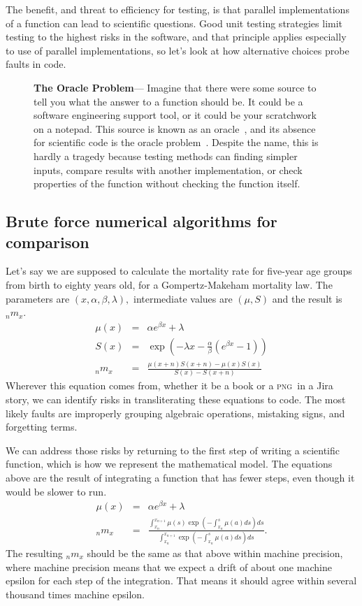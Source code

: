 \documentclass[fleqn,10pt]{olplainarticle}
\newenvironment{callout}
{
\begin{figure}
\begin{center}
\begin{minipage}{0.9\textwidth}
\begin{framed}
}
{
\end{framed}
\end{minipage}
\end{center}
\end{figure}
}
\begin{document}
The benefit, and threat to efficiency for testing, is that
parallel implementations of a function can lead to scientific
questions. Good unit testing strategies limit testing to the
highest risks in the software, and that principle applies
especially to use of parallel implementations, so let's
look at how alternative choices probe faults in code.

\begin{callout}
\textbf{The Oracle Problem}---
Imagine that there were some source to tell you what the answer to a function
should be. It could be a software engineering support tool, or it could
be your scratchwork on a notepad. This source is known as an
oracle~\citep{howden1986functional}, and its absence for scientific code
is the oracle problem~\citep{sirer1999using}. Despite the name, this
is hardly a tragedy because testing methods can 
finding simpler inputs, compare results with another implementation,
or check properties of the function without checking the function itself.
\end{callout}


\subsection{Brute force numerical algorithms for comparison}

Let's say we are supposed to calculate the mortality rate
for five-year age groups from birth to eighty years old,
for a Gompertz-Makeham mortality law. The parameters are
$(x, \alpha, \beta, \lambda),$ intermediate values are $(\mu, S)$ and the result is ${}_nm_x$.
\begin{eqnarray}
  \mu(x) & =&  \alpha e^{\beta x} + \lambda \\
  S(x) & = & \exp\left(-\lambda x - \frac{\alpha}{\beta}\left(e^{\beta x} - 1\right)\right) \\
  {}_nm_x & = & \frac{\mu(x+n) S(x+n) - \mu(x)S(x)}{S(x) - S(x+n)}
\end{eqnarray}
Wherever this equation comes from, whether it be a book or a
\textsc{png}\ in a Jira story, we can identify risks in transliterating
these equations to code. The most likely faults are improperly grouping
algebraic operations, mistaking signs, and forgetting terms. 

We can address those risks by returning to the first step of writing
a scientific function, which is how we represent the mathematical model.
The equations above are the result of integrating a function that has fewer
steps, even though it would be slower to run.
\begin{eqnarray}
  \mu(x) & =&  \alpha e^{\beta x} + \lambda \\
  {}_nm_x & = &\frac{\int_{x_n}^{x_{n+1}}\mu(s) \exp(-\int_{x_n}^s\mu(a)ds)ds}{\int_{x_n}^{x_{n+1}}\exp(-\int_{x_n}^s\mu(a)ds)ds}.
\end{eqnarray}
The resulting ${}_nm_x$ should be the same as that above within
machine precision, where machine precision means that we expect a drift
of about one machine epsilon for each step of the integration. That means
it should agree within several thousand times machine epsilon.
\end{document}
